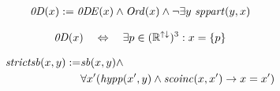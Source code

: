 \begin{erin}
    \begin{align*}
        \GzeroD(x) := \GzeroDE(x) \wedge \GOrd(x) \wedge \neg\exists y\ \Gsppart(y,x)
    \end{align*}
\end{erin}

\begin{hyp}\label{satz:zerod}
    \begin{align*}
        \mathit{0D}(x) \quad \Leftrightarrow \quad \exists p \in (\mathbb{R}^{{\uparrow \downarrow}})^3 : x = \{p\}
    \end{align*}
\end{hyp}


\begin{erin}
    \begin{align*}
        \mathit{strictsb}(x,y) :=
        &\mathit{sb}(x,y) \wedge \\
        &\forall x' (\mathit{hypp}(x',y) \wedge \mathit{scoinc}(x,x') \to x=x')
    \end{align*}
\end{erin}

